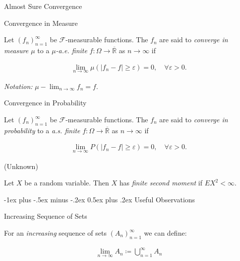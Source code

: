 \documentclass[10pt,landscape]{article}
\makeatletter
\renewcommand{\geq}{\geqslant}
\newcommand{\CalF}{\mathcal{F}}
\renewcommand{\section}{\@startsection{section}{1}{0mm}%
                                {-1ex plus -.5ex minus -.2ex}%
                                {0.5ex plus .2ex}%
                                {\normalfont\large\bfseries}}
\makeatother
\begin{document}
\begin{multicols}{3}
\begin{definition}{5.1}{Almost Sure Convergence}
\end{definition}

\begin{definition}{5.2}{Convergence in Measure}

    Let $(f_n)_{n=1}^{\infty}$ be $\CalF$-measurable functions. The $f_n$ are said to \emph{converge in measure $\mu$} to a \emph{$\mu$-a.e. finite} $f: \Omega \to \overline{\mathbb{R}}$ as $n \to \infty$ if

        \begin{align*}
            \lim_{n \to \infty} \mu(|f_n - f| \geq \varepsilon) = 0, \quad \forall \varepsilon > 0.
        \end{align*}

    \emph{Notation:} $\mu-\lim_{n \to \infty} f_n = f$.

\end{definition}

\begin{definition}{5.2}{Convergence in Probability}

    Let $(f_n)_{n=1}^{\infty}$ be $\CalF$-measurable functions. The $f_n$ are said to \emph{converge in probability} to a \emph{a.s. finite} $f: \Omega \to \overline{\mathbb{R}}$ as $n \to \infty$ if

        \begin{align*}
            \lim_{n \to \infty} P(|f_n - f| \geq \varepsilon) = 0, \quad \forall \varepsilon > 0.
        \end{align*}

\end{definition}

\begin{definition}{(Unknown)}{}

    Let $X$ be a random variable. Then $X$ has \emph{finite second moment} if $EX^2 < \infty$.

\end{definition}


\section{Useful Observations}

\begin{observation}{}{Increasing Sequence of Sets}

    For an \emph{increasing} sequence of sets $(A_n)_{n=1}^{\infty}$ we can define:

        \begin{align*}
            \lim_{n \to \infty} A_n \coloneqq \bigcup_{n=1}^{\infty} A_n
        \end{align*}


\end{observation}
\end{multicols}
\end{document}
